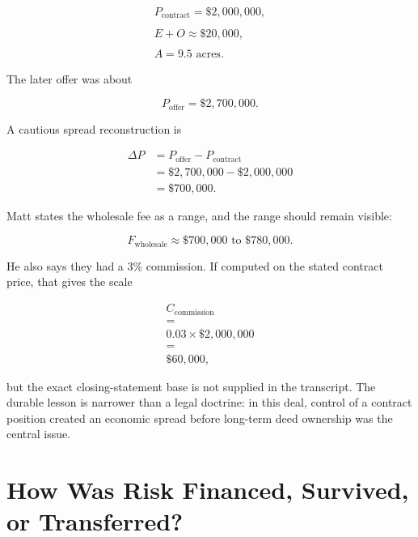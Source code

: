 \documentclass[11pt,oneside]{book}
\begin{document}
\begin{equation}
\begin{gathered}
P_{\text{contract}}=\$2{,}000{,}000,\\
\qquad\\
E+O\approx \$20{,}000,\\
\qquad\\
A=9.5\text{ acres}.
\end{gathered}
\end{equation}

The later offer was about

\begin{equation}
P_{\text{offer}}=\$2{,}700{,}000.
\end{equation}

A cautious spread reconstruction is

\begin{align}
\Delta P
&=P_{\text{offer}}-P_{\text{contract}}\\
&=\$2{,}700{,}000-\$2{,}000{,}000\\
&=\$700{,}000.
\end{align}

Matt states the wholesale fee as a range, and the range should remain visible:

\begin{equation}
F_{\text{wholesale}}\approx \$700{,}000\text{ to }\$780{,}000.
\end{equation}

He also says they had a 3\% commission. If computed on the stated contract price, that gives the scale

\begin{equation}
\begin{gathered}
C_{\text{commission}}\\
=\\
0.03\times \$2{,}000{,}000\\
=\\
\$60{,}000,
\end{gathered}
\end{equation}

but the exact closing-statement base is not supplied in the transcript. The durable lesson is narrower than a legal doctrine: in this deal, control of a contract position created an economic spread before long-term deed ownership was the central issue.

\chapter{How Was Risk Financed, Survived, or Transferred?}
\end{document}
